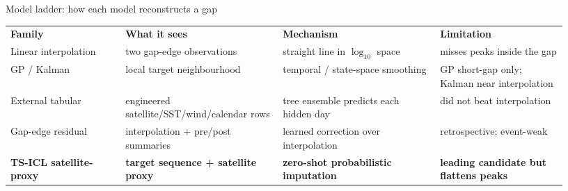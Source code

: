 \documentclass[10pt]{article}
\renewcommand{\arraystretch}{1.05}
\newlength{\colw}
\newcommand{\tblhead}[1]{\bfseries\color{white}#1}
\begin{document}
\begin{minipage}[t]{\colw}
\begin{panel}[height=27.3cm,colframe=ocean,colbacktitle=ocean,
boxed title style={colframe=ocean,colback=ocean,boxrule=0pt,arc=1.8pt,
left=0.65em,right=0.65em,top=0.12em,bottom=0.12em}]
{Model ladder: how each model reconstructs a gap}

{\fontsize{11.6}{13.2}\selectfont
\renewcommand{\arraystretch}{1.40}
\begin{tabular}{@{}p{0.19\linewidth}p{0.265\linewidth}p{0.265\linewidth}p{0.21\linewidth}@{}}
\rowcolor{ocean}
\tblhead{Family} & \tblhead{What it sees} & \tblhead{Mechanism} & \tblhead{Limitation}\\

\rowcolor{softgray}
Linear interpolation &
two gap-edge observations &
straight line in $\log_{10}$ space &
misses peaks inside the gap\\

\rowcolor{white}
GP / Kalman &
local target neighbourhood &
temporal / state-space smoothing &
GP short-gap only; Kalman near interpolation\\

\rowcolor{softgray}
External tabular &
engineered satellite/SST/wind/calendar rows &
tree ensemble predicts each hidden day &
did not beat interpolation\\

\rowcolor{white}
Gap-edge residual &
interpolation + pre/post summaries &
learned correction over interpolation &
retrospective; event-weak\\

\rowcolor{red!12}
\textcolor{red!75!black}{\textbf{TS-ICL satellite-proxy}} &
\textcolor{red!75!black}{\textbf{target sequence + satellite proxy}} &
\textcolor{red!75!black}{\textbf{zero-shot probabilistic imputation}} &
\textcolor{red!75!black}{\textbf{leading candidate but flattens peaks}}\\
\end{tabular}}

\vspace{0.28cm}

\begin{tcolorbox}[
  enhanced,
  colframe=red!70!black,
  colback=red!3,
  boxrule=0.9pt,
  arc=2pt,
  left=0.35cm,
  right=0.35cm,
  top=0.24cm,
  bottom=0.24cm
]


\end{tcolorbox}
\end{panel}
\end{minipage}
\end{document}
